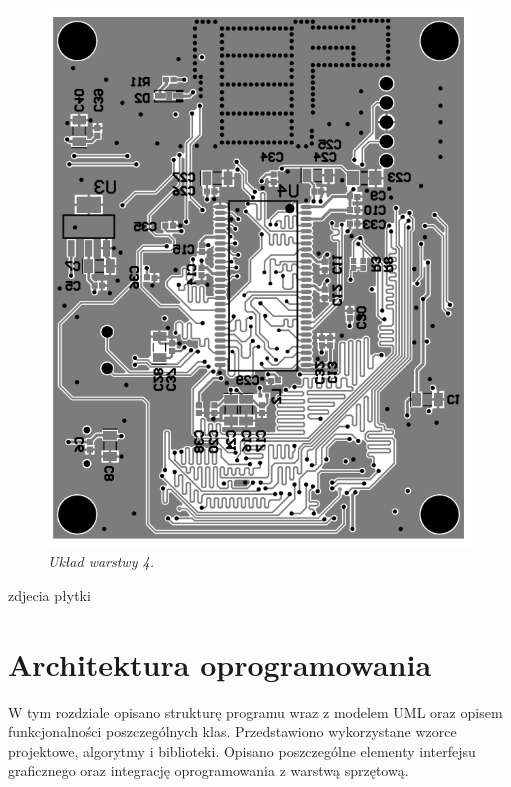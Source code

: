 \documentclass[eng,printmode]{mgr}
\begin{document}
\begin{center}\centering
\vspace*{\fill}
\begin{figure}[!h]
    \centering
    \includegraphics[width=\textwidth]{pcb/bottom.png}
    \caption{\textit{\scriptsize Układ warstwy 4.}}
\end{figure}
\vfill
\end{center}
\newpage
zdjecia płytki
\newpage
\chapter{ Architektura oprogramowania}

W tym rozdziale opisano strukturę programu wraz z modelem UML oraz opisem funkcjonalności poszczególnych klas. Przedstawiono wykorzystane wzorce projektowe, algorytmy i biblioteki. Opisano poszczególne elementy interfejsu graficznego oraz integrację oprogramowania z warstwą sprzętową.
\end{document}
